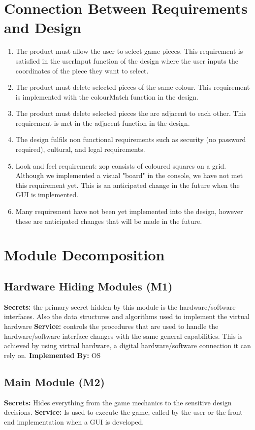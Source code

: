 \documentclass[12pt]{article}
\begin{document}
\section{Connection Between Requirements and Design}
\begin{enumerate}
 \item The product must allow the user to select game pieces.  This requirement is satisfied in the userInput function of the design where the user inputs the coordinates of the piece they want to select.
 \item The product must delete selected pieces of the same colour.  This requirement is implemented with the colourMatch function in the design.
 \item The product must delete selected pieces the are adjacent to each other.  This requirement is met in the adjacent function in the design.
 \item The design fulfils non functional requirements such as security (no password required), cultural, and legal requirements.
 \item Look and feel requirement: zop consists of coloured squares on a grid.  Although we implemented a visual "board" in the console, we have not met this requirement yet.  This is an anticipated change in the future when the GUI is implemented.
 \item Many requirement have not been yet implemented into the design, however these are anticipated changes that will be made in the future.
\end{enumerate}

\section{Module Decomposition}
\subsection{Hardware Hiding Modules (M1)}
\textbf{Secrets:} the primary secret hidden by this module is the hardware/software interfaces. Also the data structures and algorithms used to implement the virtual hardware
\textbf{Service:} controls the procedures that are used to handle the hardware/software interface changes with the same general capabilities. This is achieved by using virtual hardware, a digital hardware/software connection it can rely on. 
\textbf{Implemented By:} OS

\subsection{Main Module (M2)}
\textbf{Secrets:} Hides everything from the game mechanics to the sensitive design decisions.
\textbf{Service:} Is used to execute the game, called by the user or the front-end implementation when a GUI is developed.
\end{document}
